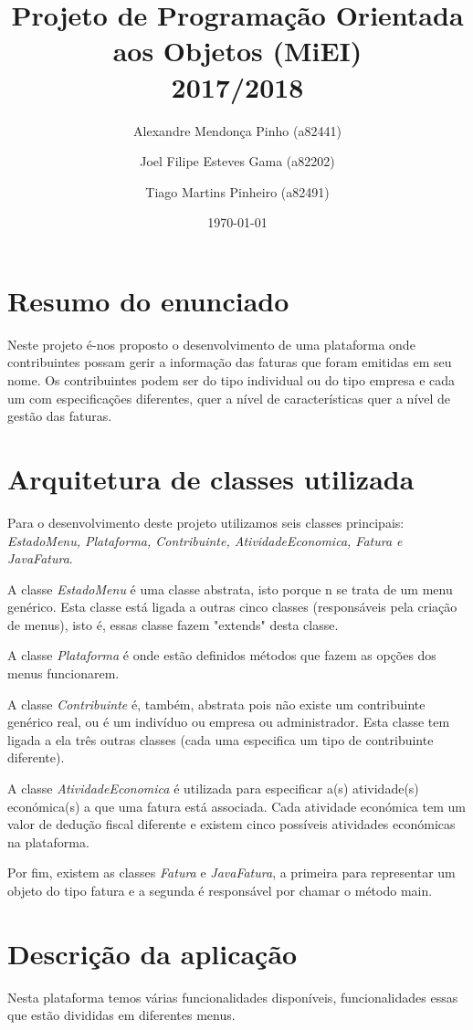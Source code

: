 \documentclass[12pt]{report}
\title{Projeto de Programação Orientada aos Objetos (MiEI) \\ 2017/2018}
\author{Alexandre Mendonça Pinho (a82441) \and Joel Filipe Esteves Gama (a82202) \and Tiago Martins Pinheiro (a82491)}
\date{\today}
\newcommand\tab[1][0.5cm]{\hspace*{#1}}
\begin{document}
\maketitle

\tableofcontents

\chapter{Resumo do enunciado}
\label{sec:resumo}

\tab Neste projeto é-nos proposto o desenvolvimento de uma plataforma onde contribuintes possam gerir a informação das faturas que foram emitidas em seu nome. Os contribuintes podem ser do tipo individual ou do tipo empresa e cada um com especificações diferentes, quer a nível de características quer a nível de gestão das faturas.

\chapter{Arquitetura de classes utilizada}
\label{sec:arquitetura}
\tab Para o desenvolvimento deste projeto utilizamos seis classes principais: \textit{EstadoMenu, Plataforma, Contribuinte, AtividadeEconomica, Fatura e JavaFatura}.

A classe \textit{EstadoMenu} é uma classe abstrata, isto porque n se trata de um menu genérico. Esta classe está ligada a outras cinco classes (responsáveis pela criação de menus), isto é, essas classe fazem "extends" desta classe.

A classe \textit{Plataforma} é onde estão definidos métodos que fazem as opções dos menus funcionarem.

A classe \textit{Contribuinte} é, também, abstrata pois não existe um contribuinte genérico real, ou é um indivíduo ou empresa ou administrador. Esta classe tem ligada a ela três outras classes (cada uma especifica um tipo de contribuinte diferente).

A classe \textit{AtividadeEconomica} é utilizada para especificar a(s) atividade(s) económica(s) a que uma fatura está associada. Cada atividade económica tem um valor de dedução fiscal diferente e existem cinco possíveis atividades económicas na plataforma.

Por fim, existem as classes \textit{Fatura} e \textit{JavaFatura}, a primeira para representar um objeto do tipo fatura e a segunda é responsável por chamar o método main.

\chapter{Descrição da aplicação}
\label{sec:descricao}
\tab Nesta plataforma temos várias funcionalidades disponíveis, funcionalidades essas que estão divididas em diferentes menus.
\end{document}
